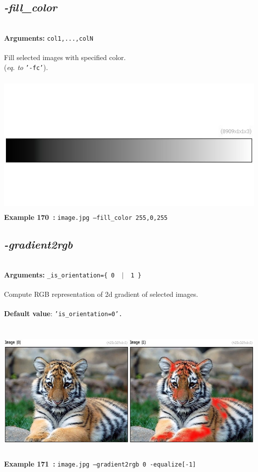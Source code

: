 \documentclass[a4paper,11pt,twoside]{book}
\begin{document}
\subsection{\emph{-fill\_color} }\vspace*{-0.5em}
~\\\textbf{Arguments: } 
{\small \texttt{col1,...,colN}}\\~\\
Fill selected images with specified color.
~\\(\emph{eq. to} {\small \texttt{'-fc'}}).
\begin{center}\includegraphics[keepaspectratio=true,height=7cm,width=\textwidth]{img/gmic_def170.jpg}\\
{\footnotesize \textbf{Example 170~:} \texttt{image.jpg --fill\_color 255,0,255}}
\end{center}

\subsection{\emph{-gradient2rgb} }\vspace*{-0.5em}
~\\\textbf{Arguments: } 
{\small \texttt{\_is\_orientation=\{ 0 ~$|$~ 1 \}}}\\~\\
Compute RGB representation of 2d gradient of selected images.
~\\~\\\textbf{Default value}: {\small \texttt{'is\_orientation=0'.}}
\begin{center}\includegraphics[keepaspectratio=true,height=7cm,width=\textwidth]{img/gmic_def171.jpg}\\
{\footnotesize \textbf{Example 171~:} \texttt{image.jpg --gradient2rgb 0 -equalize[-1]}}
\end{center}
\end{document}
